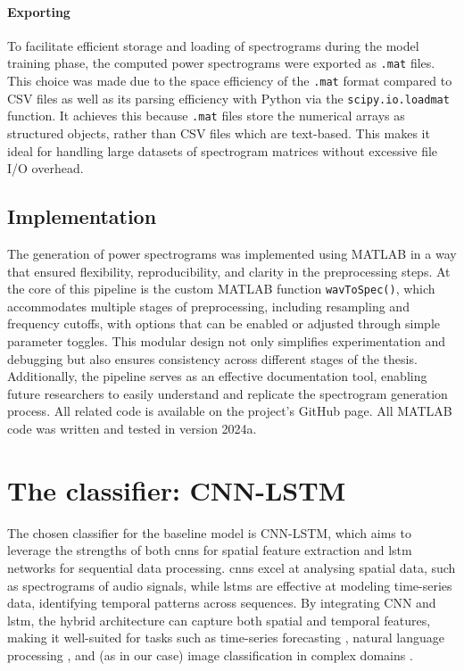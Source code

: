 \paragraph{Exporting}
To facilitate efficient storage and loading of spectrograms during the model training phase, the computed power spectrograms were exported as \texttt{.mat} files. This choice was made due to the space efficiency of the \texttt{.mat} format compared to CSV files as well as its parsing efficiency with Python via the \texttt{scipy.io.loadmat} function. It achieves this because \texttt{.mat} files store the numerical arrays as structured objects, rather than CSV files which are text-based. This makes it ideal for handling large datasets of spectrogram matrices without excessive file I/O overhead. 

\subsection{Implementation}

The generation of power spectrograms was implemented using MATLAB in a way that ensured flexibility, reproducibility, and clarity in the preprocessing steps. At the core of this pipeline is the custom MATLAB function \texttt{wavToSpec()}, which accommodates multiple stages of preprocessing, including resampling and frequency cutoffs, with options that can be enabled or adjusted through simple parameter toggles. This modular design not only simplifies experimentation and debugging but also ensures consistency across different stages of the thesis. Additionally, the pipeline serves as an effective documentation tool, enabling future researchers to easily understand and replicate the spectrogram generation process. All related code is available on the project's GitHub page. All MATLAB code was written and tested in version 2024a.

\section{The classifier: CNN-LSTM}

The chosen classifier for the baseline model is CNN-LSTM, which aims to leverage the strengths of both \acrshort{cnn}s for spatial feature extraction and \acrshort{lstm} networks for sequential data processing. \acrshort{cnn}s excel at analysing spatial data, such as spectrograms of audio signals, while \acrshort{lstm}s are effective at modeling time-series data, identifying temporal patterns across sequences. By integrating CNN and \acrshort{lstm}, the hybrid architecture can capture both spatial and temporal features, making it well-suited for tasks such as time-series forecasting \cite{kim_predicting_2019, lu_cnn-lstm-based_2020}, natural language processing \cite{wang_dimensional_2016, umer_fake_2020}, and (as in our case) image classification in complex domains \cite{vankdothu_brain_2022, islam_combined_2020}. 

